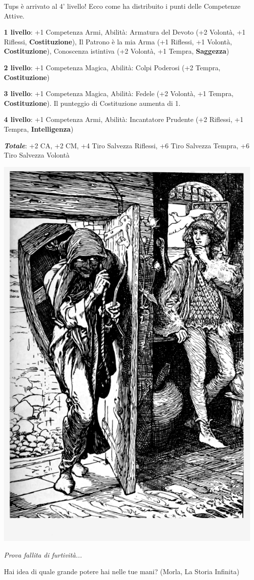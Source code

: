\vspace{2cm}

\begin{giocatore}
Tups è arrivato al 4' livello! Ecco come ha distribuito i punti delle Competenze Attive.

\textbf{1 livello}: +1 Competenza Armi, Abilità: Armatura del Devoto (+2 Volontà, +1 Riflessi, \textbf{Costituzione}), Il Patrono è la mia Arma (+1 Riflessi, +1 Volontà, \textbf{Costituzione}), Conoscenza istintiva (+2 Volontà, +1 Tempra, \textbf{Saggezza})

\textbf{2 livello}: +1 Competenza Magica, Abilità: Colpi Poderosi (+2 Tempra, \textbf{Costituzione})

\textbf{3 livello}: +1 Competenza Magica, Abilità: Fedele (+2 Volontà, +1 Tempra, \textbf{Costituzione}). Il punteggio di Costituzione aumenta di 1.

\textbf{4 livello}: +1 Competenza Armi, Abilità: Incantatore Prudente (+2 Riflessi, +1 Tempra, \textbf{Intelligenza})

\textbf{\emph{Totale}}: +2 CA, +2 CM, +4 Tiro Salvezza Riflessi, +6 Tiro Salvezza Tempra, +6 Tiro Salvezza Volontà

\end{giocatore}

\vfill

\begin{center}
\includegraphics[width=0.45\linewidth]{immagini/attaccoallespalle.png}

\emph{Prova fallita di furtività...}
\end{center}


\bigskip

\begin{enfasi}
	Hai idea di quale grande potere hai nelle tue mani? (Morla, La Storia Infinita)
\end{enfasi}

\pagebreak

